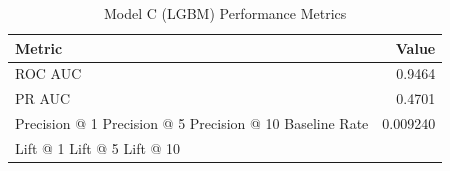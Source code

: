 \begin{table}[h]
\centering
\begin{tabular}{lr}
\toprule
Metric & Value \\
\midrule
ROC AUC & 0.9464 \\
PR AUC & 0.4701 \\
Precision @ 1%
Precision @ 5%
Precision @ 10%
Baseline Rate & 0.009240 \\
Lift @ 1%
Lift @ 5%
Lift @ 10%
\bottomrule
\end{tabular}
\caption{Model C (LGBM) Performance Metrics}
\label{tab:modelc_lgbm_metrics}
\end{table}
